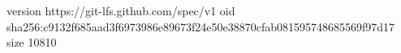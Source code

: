 version https://git-lfs.github.com/spec/v1
oid sha256:c9132f685aad3f6973986e89673f24e50e38870cfab081595748685569f97d17
size 10810
